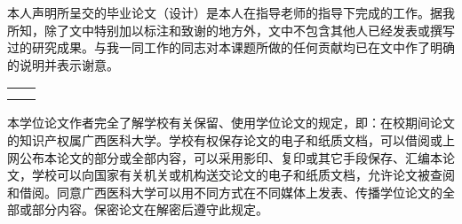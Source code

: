 本人声明所呈交的毕业论文（设计）是本人在指导老师的指导下完成的工作。据我所知，除了文中特别加以标注和致谢的地方外，文中不包含其他人已经发表或撰写过的研究成果。与我一同工作的同志对本课题所做的任何贡献均已在文中作了明确的说明并表示谢意。
\newline

\begin{table}[!h]
    \centering
    \begin{tabular*}{\textwidth}{@{\extracolsep{\fill}}ll}
	


	&\tsign{\hwrite{\asignWidth}{\ahwrite}}
	\\[13pt]
	&\signdate{\asignY}{\asignM}{\asignD}\\
\end{tabular*}
\end{table}


\vspace{26pt}
本学位论文作者完全了解学校有关保留、使用学位论文的规定，即：在校期间论文的知识产权属广西医科大学。学校有权保存论文的电子和纸质文档，可以借阅或上网公布本论文的部分或全部内容，可以采用影印、复印或其它手段保存、汇编本论文，学校可以向国家有关机关或机构送交论文的电子和纸质文档，允许论文被查阅和借阅。同意广西医科大学可以用不同方式在不同媒体上发表、传播学位论文的全部或部分内容。保密论文在解密后遵守此规定。
\newline


